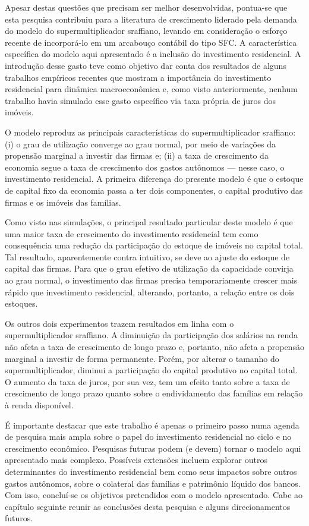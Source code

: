 Apesar destas questões que precisam ser melhor desenvolvidas, pontua-se que 
esta pesquisa contribuiu para a literatura de crescimento liderado pela demanda do modelo do supermultiplicador sraffiano, levando em consideração o esforço recente de incorporá-lo em um arcabouço contábil do tipo SFC.  A característica específica do modelo aqui apresentado é a inclusão do investimento residencial. A introdução desse gasto teve como objetivo dar conta dos resultados de alguns trabalhos empíricos recentes que mostram a importância do investimento residencial para dinâmica macroeconômica e, como visto anteriormente, nenhum trabalho havia simulado esse gasto específico via taxa própria de juros dos imóveis. 

O modelo reproduz as principais características do supermultiplicador sraffiano: (i) o grau de utilização converge ao grau normal, por meio de variações da propensão marginal a investir das firmas e; (ii) a taxa de crescimento da economia segue a taxa de crescimento dos gastos autônomos --- nesse caso, o investimento residencial. A primeira diferença do  presente modelo é que o estoque de capital fixo da economia passa a ter dois componentes, o capital produtivo das firmas e os imóveis das famílias. 

Como visto nas simulações, o principal resultado particular deste modelo é que uma maior taxa de crescimento do investimento residencial tem como consequência uma redução da participação do estoque de imóveis no capital total. Tal resultado, aparentemente contra intuitivo, se deve ao ajuste do estoque de capital das firmas. Para que o grau efetivo de utilização da capacidade convirja ao grau normal, o investimento das firmas precisa temporariamente crescer mais rápido que investimento residencial, alterando, portanto, a relação entre os dois estoques. 

Os outros dois experimentos trazem resultados em linha com o supermultiplicador sraffiano. A diminuição da participação dos salários na renda não afeta a taxa de crescimento de longo prazo e, portanto, não afeta a propensão marginal a investir de forma permanente. Porém, por alterar o tamanho do supermultiplicador, diminui a participação do capital produtivo no capital total. O aumento da taxa de juros, por sua vez, tem um efeito tanto sobre a taxa de crescimento de longo prazo quanto sobre o endividamento das famílias em relação à renda disponível. 

É importante destacar que este trabalho é apenas o primeiro passo numa agenda de pesquisa mais ampla sobre o papel do investimento residencial no ciclo e no crescimento econômico. Pesquisas futuras podem (e devem) tornar o modelo aqui apresentado mais complexo. Possíveis extensões incluem explorar outros determinantes do investimento residencial bem como seus impactos sobre outros gastos autônomos, sobre o colateral das famílias e patrimônio líquido dos bancos.
Com isso, concluí-se os objetivos pretendidos com o modelo apresentado. Cabe ao capítulo seguinte reunir as conclusões desta pesquisa e alguns direcionamentos futuros.
